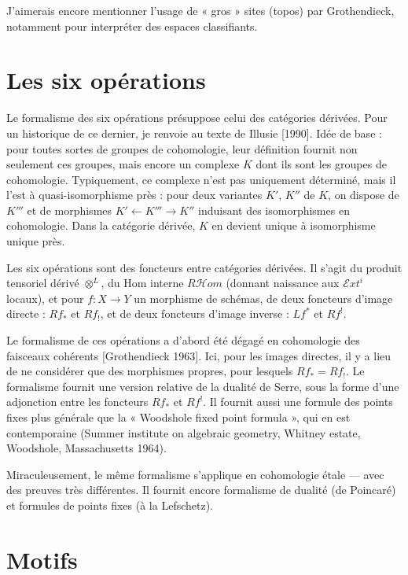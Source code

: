 \documentclass[11pt]{article}
\begin{document}
J'aimerais encore mentionner l'usage de « gros » sites (topos) par Grothendieck, notamment pour interpréter des espaces classifiants.

\section{Les six opérations}

Le formalisme des six opérations présuppose celui des catégories dérivées. Pour un historique de ce dernier, je renvoie au texte de Illusie [1990]. Idée de base : pour toutes sortes de groupes de cohomologie, leur définition fournit non seulement ces groupes, mais encore un complexe \(K\) dont ils sont les groupes de cohomologie. Typiquement, ce complexe n'est pas uniquement déterminé, mais il l'est à quasi-isomorphisme près : pour deux variantes \(K'\), \(K''\) de \(K\), on dispose de \(K'''\) et de morphismes \(K'\leftarrow K'''\to K''\) induisant des isomorphismes en cohomologie. Dans la catégorie dérivée, \(K\) en devient unique à isomorphisme unique près.

Les six opérations sont des foncteurs entre catégories dérivées. Il s'agit du produit tensoriel dérivé \(\otimes^L\), du Hom interne \(R\mathcal Hom\) (donnant naissance aux \(\mathcal Ext^i\) locaux), et pour \(f:X\to Y\) un morphisme de schémas, de deux foncteurs d'image directe : \(Rf_*\) et \(Rf_!\), et de deux foncteurs d'image inverse : \(Lf^*\) et \(Rf^!\).

Le formalisme de ces opérations a d'abord été dégagé en cohomologie des faisceaux cohérents [Grothendieck 1963]. Ici, pour les images directes, il y a lieu de ne considérer que des morphismes propres, pour lesquels \(Rf_* = Rf_!\). Le formalisme fournit une version relative de la dualité de Serre, sous la forme d'une adjonction entre les foncteurs \(Rf_*\) et \(Rf^!\). Il fournit aussi une formule des points fixes plus générale que la « Woodshole fixed point formula », qui en est contemporaine (Summer institute on algebraic geometry, Whitney estate, Woodshole, Massachusetts 1964).

Miraculeusement, le même formalisme s'applique en cohomologie étale — avec des preuves très différentes. Il fournit encore formalisme de dualité (de Poincaré) et formules de points fixes (à la Lefschetz).

\section{Motifs}
\end{document}
